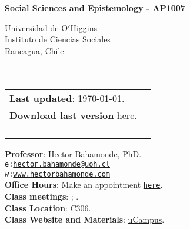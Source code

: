 \documentclass[letterpaper]{article}
\def\name{Social Sciences and Epistemology - AP1007}
\begin{document}

\centerline{\huge \bf \name}

\vspace{0.25in}

\begin{minipage}{0.45\linewidth}
 Universidad de O$'$Higgins \\
  Instituto de Ciencias Sociales \\
  Rancagua, Chile\\
  \\
  \\

\end{minipage}
\hspace{4cm}\begin{minipage}{0.45\linewidth}
  \begin{tabular}{ll}
{\bf Last updated}: \today. \\
 {\bf Download last version} \href{https://github.com/hbahamonde/Social_Sciences_Epistemology_UGRAD/raw/master/Bahamonde_Social_Sciences_Epistemology_UGRAD_Syllabus.pdf}{here}.%
    \\
    \\
    \\
    \\
    \\
  \end{tabular}
\end{minipage}

\vspace{-5mm}
{\bf Professor}: Hector Bahamonde, PhD.\\
\texttt{e:}\href{mailto:hector.bahamonde@uoh.cl}{\texttt{hector.bahamonde@uoh.cl}}\\
\texttt{w:}\href{http://www.hectorbahamonde.com}{\texttt{www.hectorbahamonde.com}}\\
{\bf Office Hours}: Make an appointment \href{https://calendly.com/bahamonde/officehours}{\texttt{here}}.\\

\vspace{1mm}
{\bf Class meetings}: {\unskip}; {\unskip}.\\
{\bf Class Location}: C306.\\
{\bf Class Website and Materials}: \href{https://ucampus.uoh.cl/uoh/2018/2/AP1007/1/}{uCampus}.
\end{document}
